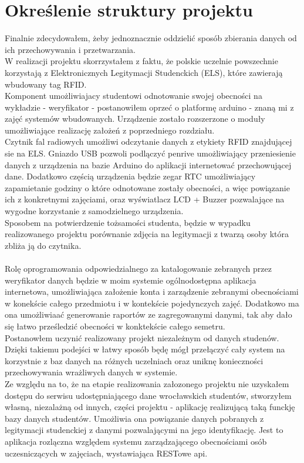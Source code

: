 \documentclass[declaration,shortabstract, mgr]{iithesis}
\begin{document}
\chapter{Określenie struktury projektu}
\indent Finalnie zdecydowałem, żeby jednoznacznie oddzielić sposób zbierania danych od ich przechowywania i przetwarzania.\\
\indent W realizacji projektu skorrzystałem z faktu, że polskie uczelnie powszechnie korzystają z Elektronicznych Legitymacji Studenckich (ELS), które zawierają wbudowany tag RFID. \\
\indent Komponent umożliwiajacy studentowi odnotowanie swojej obecności na wykładzie - weryfikator - postanowiłem oprzeć o platformę arduino - znaną mi z zajęć systemów wbudowanych. Urządzenie zostało rozszerzone o moduły umożliwiające  realizację założeń z poprzedniego rozdziału. \\
Czytnik fal radiowych umożliwi odczytanie danych z etykiety RFID znajdującej sie na ELS.  Gniazdo USB  pozwoli podlączyć penrive umożliwiający przeniesienie danych z urządzenia na bazie Arduino do aplikacji internetować przechowującej dane. Dodatkowo częścią urządzenia będzie zegar RTC umożliwiający zapamietanie godziny o które odnotowane zostały obecności, a więc powiązanie ich z konkretnymi zajęciami, oraz wyświatlacz LCD + Buzzer pozwalające na wygodne korzystanie z samodzielnego urządzenia. \\
\indent Sposobem na potwierdzenie tożsamości studenta, będzie w wypadku realizowanego projektu porównanie zdjęcia na legitymacji z twarzą osoby która zbliża ją do czytnika.\\\\

\indent Rolę oprogramowania odpowiedzialnego za katalogowanie zebranych przez weryfikator danych będzie w moim systemie ogólnodostępna aplikacja internetowa, umożliwiająca założenie konta i zarządzenie zebranymi obecnościami w konekście całego przedmiotu  i w kontekście pojedynczych zajęć. Dodatkowo ma ona umożliwiaać generowanie raportów ze zagregowanymi danymi, tak aby dało się łatwo prześledzić obecności w konktekście całego semetru. \\
\indent Postanowłem uczynić realizowany projekt niezależnym od danych studenów. Dzięki takiemu podejści w łatwy sposób będę mógł przełączyć cały system na korzystnie z baz danych na różnych uczelniach oraz uniknę konieczności przechowywania wrażliwych danych w systemie. \\
\indent Ze względu na to, że na etapie realizowania załozonego projektu nie uzyskałem dostępu do serwisu udostępniającego dane wrocławskich studentów, stworzyłem własną, niezalażną od innych, części projektu -  aplikację realizującą taką funckję bazy danych studentów.  Umożliwia ona powiązanie danych pobranych z legitymacji studenckiej z danymi pozwalającymi na jego identyfikację. Jest to aplikacja rozlączna względem systemu zarządzającego obecnościami osób uczesniczących w zajęciach, wystawiająca RESTowe api. 
\end{document}
